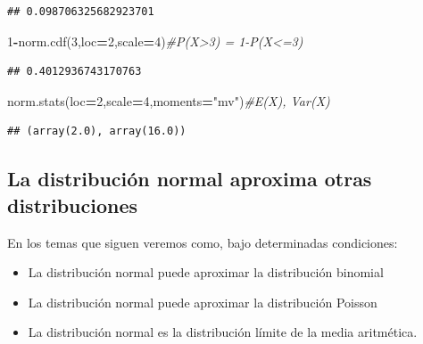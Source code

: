 \documentclass[]{book}
\newenvironment{Shaded}{\begin{snugshade}}{\end{snugshade}}
\newcommand{\CommentTok}[1]{\textcolor[rgb]{0.56,0.35,0.01}{\textit{#1}}}
\newcommand{\DecValTok}[1]{\textcolor[rgb]{0.00,0.00,0.81}{#1}}
\newcommand{\NormalTok}[1]{#1}
\newcommand{\OperatorTok}[1]{\textcolor[rgb]{0.81,0.36,0.00}{\textbf{#1}}}
\newcommand{\StringTok}[1]{\textcolor[rgb]{0.31,0.60,0.02}{#1}}
\providecommand{\tightlist}{%
  \setlength{\itemsep}{0pt}\setlength{\parskip}{0pt}}
\begin{document}
\begin{verbatim}
## 0.098706325682923701
\end{verbatim}

\begin{Shaded}
\begin{Highlighting}[]
\DecValTok{1}\OperatorTok{-}\NormalTok{norm.cdf(}\DecValTok{3}\NormalTok{,loc}\OperatorTok{=}\DecValTok{2}\NormalTok{,scale}\OperatorTok{=}\DecValTok{4}\NormalTok{)}\CommentTok{#P(X>3) = 1-P(X<=3)}
\end{Highlighting}
\end{Shaded}

\begin{verbatim}
## 0.4012936743170763
\end{verbatim}

\begin{Shaded}
\begin{Highlighting}[]
\NormalTok{norm.stats(loc}\OperatorTok{=}\DecValTok{2}\NormalTok{,scale}\OperatorTok{=}\DecValTok{4}\NormalTok{,moments}\OperatorTok{=}\StringTok{"mv"}\NormalTok{)}\CommentTok{#E(X), Var(X)}
\end{Highlighting}
\end{Shaded}

\begin{verbatim}
## (array(2.0), array(16.0))
\end{verbatim}

\hypertarget{la-distribuciuxf3n-normal-aproxima-otras-distribuciones}{%
\subsection{La distribución normal aproxima otras distribuciones}\label{la-distribuciuxf3n-normal-aproxima-otras-distribuciones}}

En los temas que siguen veremos como, bajo determinadas condiciones:

\begin{itemize}
\tightlist
\item
  La distribución normal puede aproximar la distribución binomial
\item
  La distribución normal puede aproximar la distribución Poisson
\item
  La distribución normal es la distribución límite de la media aritmética.
\end{itemize}


\end{document}
